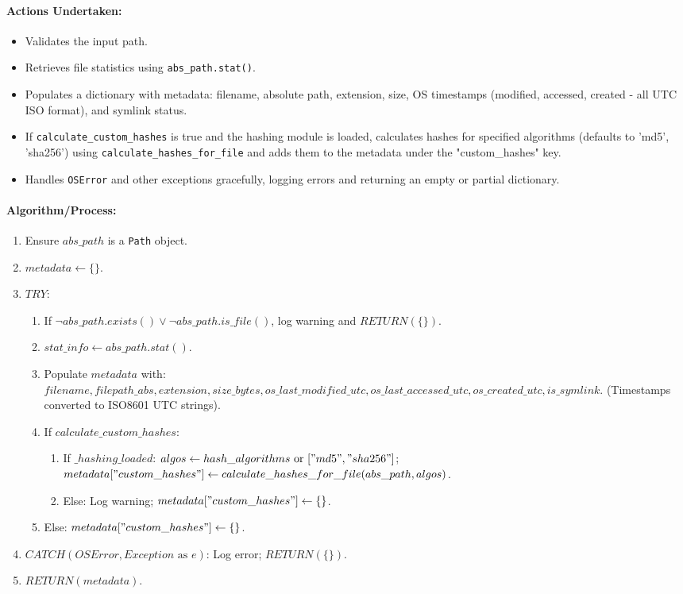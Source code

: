 \documentclass{article}
\begin{document}
\paragraph{Actions Undertaken:}
\begin{itemize}
    \item Validates the input path.
    \item Retrieves file statistics using \texttt{abs\_path.stat()}.
    \item Populates a dictionary with metadata: filename, absolute path, extension, size, OS timestamps (modified, accessed, created - all UTC ISO format), and symlink status.
    \item If \texttt{calculate\_custom\_hashes} is true and the hashing module is loaded, calculates hashes for specified algorithms (defaults to 'md5', 'sha256') using \texttt{calculate\_hashes\_for\_file} and adds them to the metadata under the "custom\_hashes" key.
    \item Handles \texttt{OSError} and other exceptions gracefully, logging errors and returning an empty or partial dictionary.
\end{itemize}
\paragraph{Algorithm/Process:}
\begin{enumerate}
    \item Ensure $abs\_path$ is a \texttt{Path} object.
    \item $metadata \leftarrow \{\}$.
    \item $TRY$:
    \begin{enumerate}
        \item If $\neg abs\_path.exists() \lor \neg abs\_path.is\_file()$, log warning and $RETURN(\{\})$.
        \item $stat\_info \leftarrow abs\_path.stat()$.
        \item Populate $metadata$ with: $filename, filepath\_abs, extension, size\_bytes, os\_last\_modified\_utc, os\_last\_accessed\_utc, os\_created\_utc, is\_symlink$. (Timestamps converted to ISO8601 UTC strings).
        \item If $calculate\_custom\_hashes$:
            \begin{enumerate}
                \item If $\_hashing\_loaded$: $algos \leftarrow hash\_algorithms \text{ or } ["md5", "sha256"]$; $metadata["custom\_hashes"] \leftarrow calculate\_hashes\_for\_file(abs\_path, algos)$.
                \item Else: Log warning; $metadata["custom\_hashes"] \leftarrow \{\}$.
            \end{enumerate}
        \item Else: $metadata["custom\_hashes"] \leftarrow \{\}$.
    \end{enumerate}
    \item $CATCH (OSError, Exception \text{ as } e)$: Log error; $RETURN(\{\})$.
    \item $RETURN(metadata)$.
\end{enumerate}
\end{document}
